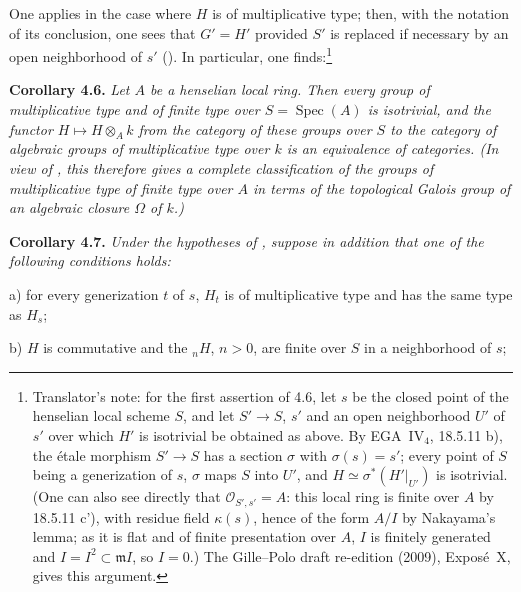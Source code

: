 One applies  in the case where \(H\) is of multiplicative type; then,
with the notation of its conclusion, one sees that \(G'=H'\) provided \(S'\)
is replaced if necessary by an open neighborhood of \(s'\) (). In
particular, one finds:\footnote{Translator's note: for the first assertion of
4.6, let \(s\) be the closed point of the henselian local scheme \(S\), and let
\(S'\to S\), \(s'\) and an open neighborhood \(U'\) of \(s'\) over which
\(H'\) is isotrivial be obtained as above. By EGA~IV\(_4\), 18.5.11 b), the
étale morphism \(S'\to S\) has a section \(\sigma\) with \(\sigma(s)=s'\);
every point of \(S\) being a generization of \(s\), \(\sigma\) maps \(S\)
into \(U'\), and \(H\simeq\sigma^*(H'|_{U'})\) is isotrivial. (One can also
see directly that \(\mathcal O_{S',s'}=A\): this local ring is finite over
\(A\) by 18.5.11 c'), with residue field \(\kappa(s)\), hence of the form
\(A/I\) by Nakayama's lemma; as it is flat and of finite presentation over
\(A\), \(I\) is finitely generated and \(I=I^2\subset\mathfrak mI\), so
\(I=0\).) The Gille--Polo draft re-edition (2009), Expos\'e~X, gives this
argument.}

\par\medskip\noindent
\textbf{Corollary 4.6.}\enspace
\begingroup\itshape
Let \(A\) be a henselian local ring. Then every group of multiplicative type
and of finite type over \(S=\operatorname{Spec}(A)\) is isotrivial, and the
functor \(H\mapsto H\otimes_A k\) from the category of these groups over
\(S\) to the category of algebraic groups of multiplicative type over \(k\)
is an equivalence of categories. \textup{(}In view of , this therefore
gives a complete classification of the groups of multiplicative type of finite
type over \(A\) in terms of the topological Galois group of an algebraic
closure \(\Omega\) of \(k\).\textup{)}
\par\endgroup

\par\medskip\noindent
\textbf{Corollary 4.7.}\enspace
\begingroup\itshape
Under the hypotheses of , suppose in addition that one of the
following conditions holds:

\smallskip
\noindent
a) for every generization \(t\) of \(s\), \(H_t\) is of multiplicative
type and has the same type as \(H_s\);

\smallskip
\noindent
b) \(H\) is commutative and the \({}_nH\), \(n>0\), are finite over \(S\)
in a neighborhood of \(s\);

